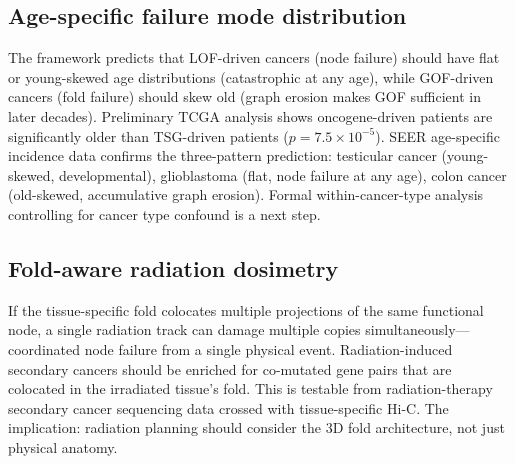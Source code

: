 \documentclass[11pt]{article}
\theoremstyle{definition}
\begin{document}
\subsection{Age-specific failure mode distribution}

The framework predicts that LOF-driven cancers (node failure) should have flat or young-skewed age distributions (catastrophic at any age), while GOF-driven cancers (fold failure) should skew old (graph erosion makes GOF sufficient in later decades). Preliminary TCGA analysis shows oncogene-driven patients are significantly older than TSG-driven patients ($p = 7.5 \times 10^{-5}$). SEER age-specific incidence data confirms the three-pattern prediction: testicular cancer (young-skewed, developmental), glioblastoma (flat, node failure at any age), colon cancer (old-skewed, accumulative graph erosion). Formal within-cancer-type analysis controlling for cancer type confound is a next step.

\subsection{Fold-aware radiation dosimetry}

If the tissue-specific fold colocates multiple projections of the same functional node, a single radiation track can damage multiple copies simultaneously---coordinated node failure from a single physical event. Radiation-induced secondary cancers should be enriched for co-mutated gene pairs that are colocated in the irradiated tissue's fold. This is testable from radiation-therapy secondary cancer sequencing data crossed with tissue-specific Hi-C. The implication: radiation planning should consider the 3D fold architecture, not just physical anatomy.
\end{document}
